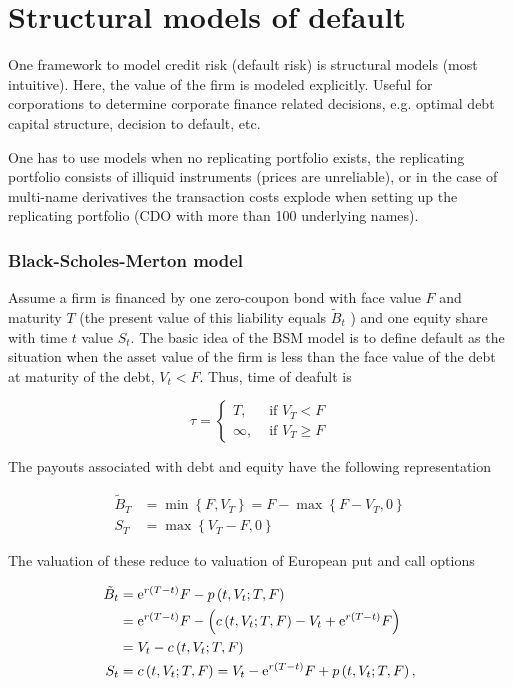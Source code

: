 \chapter{Structural models of default}
One framework to model credit risk (default risk) is structural models (most intuitive). Here, the value of the firm is modeled explicitly. Useful for corporations to determine corporate finance related decisions, e.g. optimal debt capital structure, decision to default, etc.

One has to use models when no replicating portfolio exists, the replicating portfolio consists of illiquid instruments (prices are unreliable), or in the case of multi-name derivatives the transaction costs explode when setting up the replicating portfolio (CDO with more than 100 underlying names).

\subsection{Black-Scholes-Merton model}
Assume a firm is financed by one zero-coupon bond with face value $F$ and maturity $T$ (the present value of this liability equals $\tilde{B}_{t}$ ) and one equity share with time $t$ value $S_{t}$. The basic idea of the BSM model is to define default as the situation when the asset value of the firm is less than the face value of the debt at maturity of the debt, $V_{t}<F$. Thus, time of deafult is

$$
\tau= \begin{cases}T, & \text { if } V_{T}<F \\ \infty, & \text { if } V_{T} \geq F\end{cases}
$$

The payouts associated with debt and equity have the following representation

$$
\begin{aligned}
\tilde{B}_{T} & =\min \left\{F, V_{T}\right\}=F-\max \left\{F-V_{T}, 0\right\} \\
S_{T} & =\max \left\{V_{T}-F, 0\right\}
\end{aligned}
$$

The valuation of these reduce to valuation of European put and call options

$$
\begin{aligned}
\tilde{B}_{t} & =\mathrm{e}^{r(T-t)} F-p\left(t, V_{t} ; T, F\right) \\
& =\mathrm{e}^{r(T-t)} F-\left(c\left(t, V_{t} ; T, F\right)-V_{t}+\mathrm{e}^{r(T-t)} F\right) \\
& =V_{t}-c\left(t, V_{t} ; T, F\right) \\
S_{t} & =c\left(t, V_{t} ; T, F\right)=V_{t}-\mathrm{e}^{r(T-t)} F+p\left(t, V_{t} ; T, F\right),
\end{aligned}
$$

